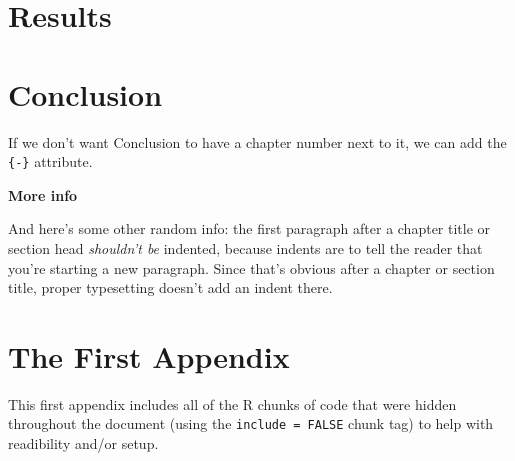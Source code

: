 \documentclass[12pt,twoside]{reedthesis}
\theoremstyle{definition}
\theoremstyle{definition}
\theoremstyle{remark}
\begin{document}
  \chapter{Results}\label{results}
  
  \chapter{Conclusion}\label{conclusion}
  
  If we don't want Conclusion to have a chapter number next to it, we can
  add the \texttt{\{-\}} attribute.
  
  \textbf{More info}
  
  And here's some other random info: the first paragraph after a chapter
  title or section head \emph{shouldn't be} indented, because indents are
  to tell the reader that you're starting a new paragraph. Since that's
  obvious after a chapter or section title, proper typesetting doesn't add
  an indent there.
  
  \appendix
  
  \chapter{The First Appendix}\label{the-first-appendix}
  
  This first appendix includes all of the R chunks of code that were
  hidden throughout the document (using the \texttt{include\ =\ FALSE}
  chunk tag) to help with readibility and/or setup.
  
\end{document}
